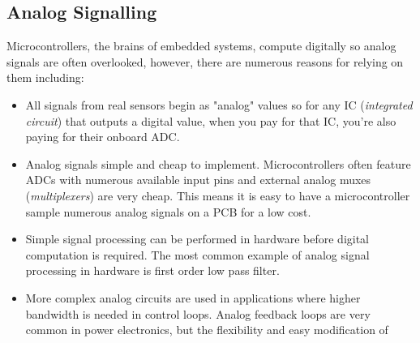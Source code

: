\documentclass[main.tex]{subfiles}
\begin{document}

\subsection{Analog Signalling}

Microcontrollers, the brains of embedded systems, compute digitally so analog signals are often overlooked, however, there are numerous reasons for relying on them including: 
\begin{itemize}
    \item All signals from real sensors begin as "analog" values so for any IC (\textit{integrated circuit}) that outputs a digital value, when you pay for that IC, you're also paying for their onboard ADC.
    \item Analog signals simple and cheap to implement. Microcontrollers often feature ADCs with numerous available input pins and external analog muxes (\textit{multiplexers}) are very cheap. This means it is easy to have a microcontroller sample numerous analog signals on a PCB for a low cost.
    \item Simple signal processing can be performed in hardware before digital computation is required. The most common example of analog signal processing in hardware is first order low pass filter. 
    \item More complex analog circuits are used in applications where higher bandwidth is needed in control loops. Analog feedback loops are very common in power electronics, but the flexibility and easy modification of 
\end{itemize}


\end{document}
